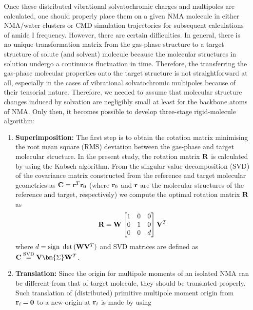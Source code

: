 \documentclass[a4paper,titlepage,twoside,fleqn,12pt]{book}
\newcommand{\BM}[1]{\bm{#1}}
\begin{document}
\begin{refsection}
Once these distributed vibrational solvatochromic
charges and multipoles are calculated, one should properly
place them on a given NMA molecule in either NMA/water
clusters or CMD simulation trajectories for subsequent calculations
of amide I frequency. However, there are certain
difficulties. In general, there is no unique transformation matrix from the gas\hyp{}phase
structure to a target structure of solute (and solvent) molecule
because the molecular structures in solution
undergo a continuous fluctuation in time.
Therefore, the transferring the gas\hyp{}phase molecular
properties onto the target structure
is not straightforward at all, especially in the cases of vibrational
solvatochromic multipoles because of their tensorial nature.
Therefore, we needed to assume that molecular
structure changes induced by solvation are negligibly small
at least for the backbone atoms of NMA. Only then, it
becomes possible to develop three\hyp{}stage rigid\hyp{}molecule
algorithm:
%
\begin{enumerate}
 \item {\bf Superimposition:} The first step is to obtain
the rotation matrix minimising the root mean square (RMS) deviation
between the gas\hyp{}phase and target molecular structure. 
In the present study, the rotation matrix $\bf R$ is calculated
by using the Kabsch algorithm. \citep{Kabsch.ActCrystSecA.1976} 
From the singular value decomposition
(SVD) of the covariance matrix constructed from the reference and target
molecular geometries as ${\bf C} = {\bf r}^T {\bf r}_0$ (where ${\bf r}_0$
and ${\bf r}$ are
the molecular structures of the reference and target, respectively) we compute
the optimal rotation matrix $\bf R$ as
 \begin{equation}
  {\bf R} = {\bf W} 
 \begin{bmatrix}
1  & 0 & 0\\ 
0  & 1 & 0\\ 
0  & 0 & d
\end{bmatrix}
  {\bf V}^T
 \end{equation}
where $d={\rm sign}\;\det{({\bf W}{\bf V}^T)}$ and SVD matrices are defined as 
${\bf C}\overset{{\rm SVD}}{=} {\bf V}{\BM \Sigma}{\bf W}^T$.
 \item {\bf Translation:} Since the origin for multipole moments
of an isolated NMA can be different from that of
target molecule, they should be translated properly. Such
translation of (distributed) primitive multipole moment
origin from ${\bf r}_i = {\bf 0}$ to a new origin at ${\bf r}_i$ is made by using

\end{enumerate}
\end{refsection}
\end{document}

